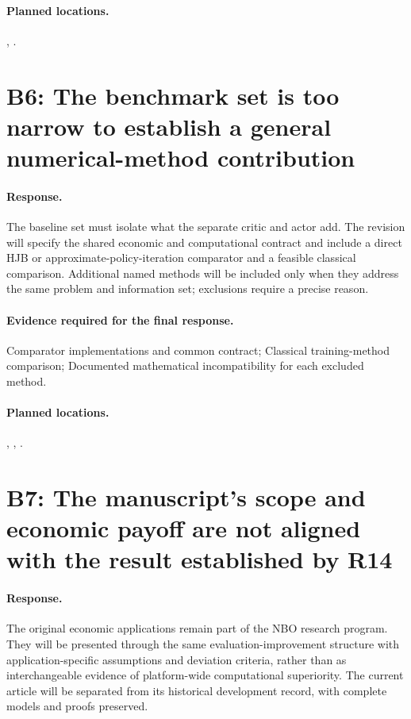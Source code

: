 \paragraph*{Planned locations.} , .

\section*{B6: The benchmark set is too narrow to establish a general numerical-method contribution}
\paragraph*{Response.} The baseline set must isolate what the separate critic and actor add. The revision will specify the shared economic and computational contract and include a direct HJB or approximate-policy-iteration comparator and a feasible classical comparison. Additional named methods will be included only when they address the same problem and information set; exclusions require a precise reason.
\paragraph*{Evidence required for the final response.} Comparator implementations and common contract; Classical training-method comparison; Documented mathematical incompatibility for each excluded method.
\paragraph*{Planned locations.} , , .

\section*{B7: The manuscript's scope and economic payoff are not aligned with the result established by R14}
\paragraph*{Response.} The original economic applications remain part of the NBO research program. They will be presented through the same evaluation-improvement structure with application-specific assumptions and deviation criteria, rather than as interchangeable evidence of platform-wide computational superiority. The current article will be separated from its historical development record, with complete models and proofs preserved.

